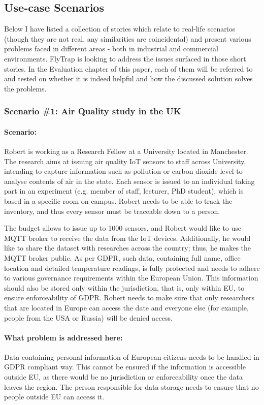\subsection{Use-case Scenarios}
Below I have listed a collection of stories which relate to real-life scenarios (though they are not real, any similarities are coincidental) and present various problems faced in different areas - both in industrial and commercial environments. FlyTrap is looking to address the issues surfaced in those short stories. In the Evaluation chapter of this paper, each of them will be referred to and tested on whether it is indeed helpful and how the discussed solution solves the problems.
\\
\subsubsection{Scenario \#1: Air Quality study in the UK}
\paragraph{\textbf{Scenario:}}
Robert is working as a Research Fellow at a University located in Manchester. The research aims at issuing air quality IoT sensors to staff across University, intending to capture information such as pollution or carbon dioxide level to analyse contents of air in the state. Each sensor is issued to an individual taking part in an experiment (e.g. member of staff, lecturer, PhD student), which is based in a specific room on campus. Robert needs to be able to track the inventory, and thus every sensor must be traceable down to a person.

The budget allows to issue up to 1000 sensors, and Robert would like to use MQTT broker to receive the data from the IoT devices. Additionally, he would like to share the dataset with researches across the country; thus, he makes the MQTT broker public. As per GDPR, such data, containing full name, office location and detailed temperature readings, is fully protected and needs to adhere to various governance requirements within the European Union. This information should also be stored only within the jurisdiction, that is, only within EU, to ensure enforceability of GDPR. Robert needs to make sure that only researchers that are located in Europe can access the date and everyone else (for example, people from the USA or Russia) will be denied access.

\paragraph{\textbf{What problem is addressed here:}}
Data containing personal information of European citizens needs to be handled in GDPR compliant way. This cannot be ensured if the information is accessible outside EU, as there would be no jurisdiction or enforceability once the data leaves the region. The person responsible for data storage needs to ensure that no people outside EU can access it.
\\
